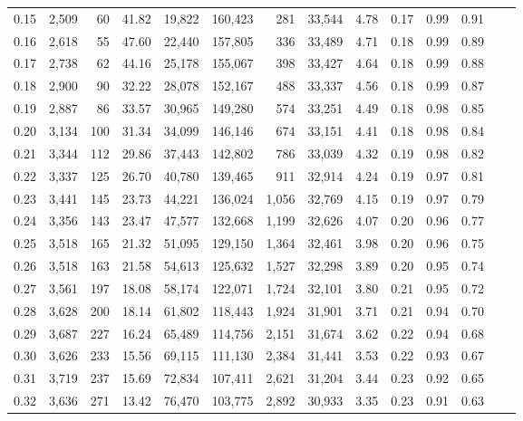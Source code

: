 \begin{tabular}{rrrrrrrrrrrrrr}
0.15 &  2,509 &   60 &   41.82 &   19,822 &  160,423 &     281 &  33,544 &  4.78 &  0.17 &  0.99 &      0.91 \\
0.16 &  2,618 &   55 &   47.60 &   22,440 &  157,805 &     336 &  33,489 &  4.71 &  0.18 &  0.99 &      0.89 \\
0.17 &  2,738 &   62 &   44.16 &   25,178 &  155,067 &     398 &  33,427 &  4.64 &  0.18 &  0.99 &      0.88 \\
0.18 &  2,900 &   90 &   32.22 &   28,078 &  152,167 &     488 &  33,337 &  4.56 &  0.18 &  0.99 &      0.87 \\
0.19 &  2,887 &   86 &   33.57 &   30,965 &  149,280 &     574 &  33,251 &  4.49 &  0.18 &  0.98 &      0.85 \\
0.20 &  3,134 &  100 &   31.34 &   34,099 &  146,146 &     674 &  33,151 &  4.41 &  0.18 &  0.98 &      0.84 \\
0.21 &  3,344 &  112 &   29.86 &   37,443 &  142,802 &     786 &  33,039 &  4.32 &  0.19 &  0.98 &      0.82 \\
0.22 &  3,337 &  125 &   26.70 &   40,780 &  139,465 &     911 &  32,914 &  4.24 &  0.19 &  0.97 &      0.81 \\
0.23 &  3,441 &  145 &   23.73 &   44,221 &  136,024 &   1,056 &  32,769 &  4.15 &  0.19 &  0.97 &      0.79 \\
0.24 &  3,356 &  143 &   23.47 &   47,577 &  132,668 &   1,199 &  32,626 &  4.07 &  0.20 &  0.96 &      0.77 \\
0.25 &  3,518 &  165 &   21.32 &   51,095 &  129,150 &   1,364 &  32,461 &  3.98 &  0.20 &  0.96 &      0.75 \\
0.26 &  3,518 &  163 &   21.58 &   54,613 &  125,632 &   1,527 &  32,298 &  3.89 &  0.20 &  0.95 &      0.74 \\
0.27 &  3,561 &  197 &   18.08 &   58,174 &  122,071 &   1,724 &  32,101 &  3.80 &  0.21 &  0.95 &      0.72 \\
0.28 &  3,628 &  200 &   18.14 &   61,802 &  118,443 &   1,924 &  31,901 &  3.71 &  0.21 &  0.94 &      0.70 \\
0.29 &  3,687 &  227 &   16.24 &   65,489 &  114,756 &   2,151 &  31,674 &  3.62 &  0.22 &  0.94 &      0.68 \\
0.30 &  3,626 &  233 &   15.56 &   69,115 &  111,130 &   2,384 &  31,441 &  3.53 &  0.22 &  0.93 &      0.67 \\
0.31 &  3,719 &  237 &   15.69 &   72,834 &  107,411 &   2,621 &  31,204 &  3.44 &  0.23 &  0.92 &      0.65 \\
0.32 &  3,636 &  271 &   13.42 &   76,470 &  103,775 &   2,892 &  30,933 &  3.35 &  0.23 &  0.91 &      0.63 \\

\end{tabular}
